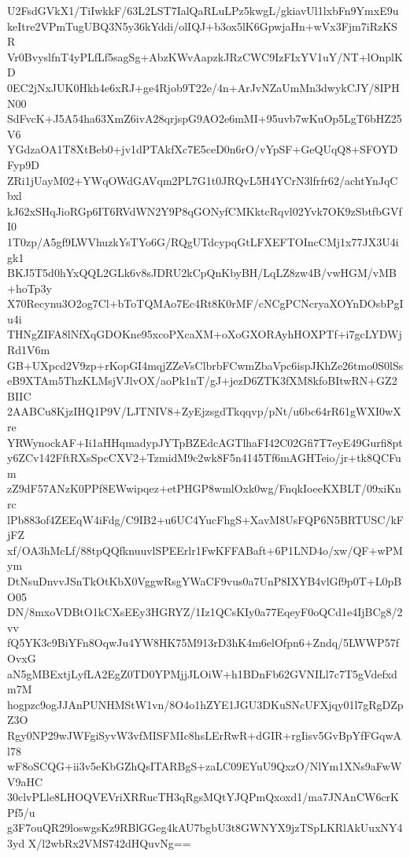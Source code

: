 U2FsdGVkX1/TiIwkkF/63L2LST7IalQaRLuLPz5kwgL/gkiavUl1lxbFn9YmxE9u
keItre2VPmTugUBQ3N5y36kYddi/olIQJ+b3ox5lK6GpwjaHn+wVx3Fjm7iRzKSR
Vr0BvyslfnT4yPLfLf5sagSg+AbzKWvAapzkJRzCWC9IzFIxYV1uY/NT+lOnplKD
0EC2jNxJUK0Hkh4e6xRJ+ge4Rjob9T22e/4n+ArJvNZaUmMn3dwykCJY/8IPHN00
SdFvcK+J5A54ha63XmZ6ivA28qrjspG9AO2e6mMI+95uvb7wKuOp5LgT6bHZ25V6
YGdzaOA1T8XtBeb0+jv1dPTAkfXc7E5ceD0n6rO/vYpSF+GeQUqQ8+SFOYDFyp9D
ZRi1jUayM02+YWqOWdGAVqm2PL7G1t0JRQvL5H4YCrN3lfrfr62/achtYnJqCbxl
kJ62xSHqJioRGp6IT6RVdWN2Y9P8qGONyfCMKktcRqvl02Yvk7OK9zSbtfbGVfI0
1T0zp/A5gf9LWVhuzkYsTYo6G/RQgUTdcypqGtLFXEFTOIncCMj1x77JX3U4igk1
BKJ5T5d0hYxQQL2GLk6v8sJDRU2kCpQnKbyBH/LqLZ8zw4B/vwHGM/vMB+hoTp3y
X70Recynu3O2og7Cl+bToTQMAo7Ec4Rt8K0rMF/cNCgPCNcryaXOYnDOsbPgIu4i
THNgZIFA8lNfXqGDOKne95xcoPXcaXM+oXoGXORAyhHOXPTf+i7gcLYDWjRd1V6m
GB+UXpcd2V9zp+rKopGI4mqjZZeVsClbrbFCwmZbaVpc6ispJKhZe26tmo0S0lSs
eB9XTAm5ThzKLMsjVJlvOX/aoPk1nT/gJ+jezD6ZTK3fXM8kfoBItwRN+GZ2BIIC
2AABCu8KjzIHQ1P9V/LJTNIV8+ZyEjzsgdTkqqvp/pNt/u6bc64rR61gWXI0wXre
YRWynockAF+Ii1aHHqmadypJYTpBZEdcAGTlhaFI42C02Gfi7T7eyE49Gurfi8pt
y6ZCv142FftRXsSpcCXV2+TzmidM9c2wk8F5n4145Tf6mAGHTeio/jr+tk8QCFum
zZ9dF57ANzK0PPf8EWwipqez+etPHGP8wmlOxk0wg/FnqkIoeeKXBLT/09xiKnrc
lPb883of4ZEEqW4iFdg/C9IB2+u6UC4YucFhgS+XavM8UsFQP6N5BRTUSC/kFjFZ
xf/OA3hMcLf/88tpQQfknuuvlSPEErlr1FwKFFABaft+6P1LND4o/xw/QF+wPMym
DtNsuDnvvJSnTkOtKbX0VggwRsgYWaCF9vus0a7UnP8IXYB4vlGf9p0T+L0pBO05
DN/8mxoVDBtO1kCXsEEy3HGRYZ/1Iz1QCsKIy0a77EqeyF0oQCd1e4IjBCg8/2vv
fQ5YK3c9BiYFn8OqwJu4YW8HK75M913rD3hK4m6elOfpn6+Zndq/5LWWP57fOvxG
aN5gMBExtjLyfLA2EgZ0TD0YPMjjJLOiW+h1BDnFb62GVNILl7c7T5gVdefxdm7M
hogpzc9ogJJAnPUNHMStW1vn/8O4o1hZYE1JGU3DKuSNcUFXjqy01l7gRgDZpZ3O
Rgy0NP29wJWFgiSyvW3vfMISFMIc8hsLErRwR+dGIR+rgIisv5GvBpYfFGqwAl78
wF8oSCQG+ii3v5eKbGZhQsITARBgS+zaLC09EYuU9QxzO/NlYm1XNs9aFwWV9aHC
30clvPLle8LHOQVEVriXRRucTH3qRgsMQtYJQPmQxoxd1/ma7JNAnCW6crKPf5/u
g3F7ouQR29loswgsKz9RBlGGeg4kAU7bgbU3t8GWNYX9jzTSpLKRlAkUuxNY43yd
X/l2wbRx2VMS742dHQuvNg==
